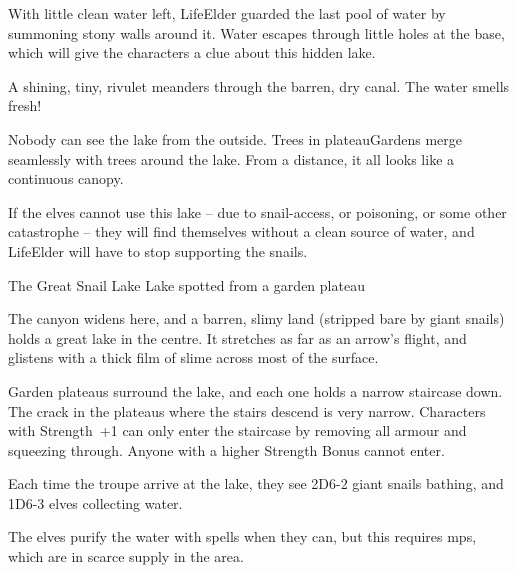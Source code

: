 
With little clean water left, \gls{LifeElder} guarded the last pool of water by summoning stony walls around it.
Water escapes through little holes at the base, which will give the characters a clue about this hidden lake.

\begin{boxtext}
  A shining, tiny, rivulet meanders through the barren, dry canal.
  The water smells fresh!
\end{boxtext}

Nobody can see the lake from the outside.
Trees in \gls{plateauGardens} merge seamlessly with trees around the lake.
From a distance, it all looks like a continuous canopy.

If the elves cannot use this lake -- due to snail-access, or poisoning, or some other catastrophe -- they will find themselves without a clean source of water, and \gls{LifeElder} will have to stop supporting the snails.

{The Great Snail Lake}%
{Lake spotted from a garden plateau}%

The canyon widens here, and a barren, slimy land (stripped bare by giant snails) holds a great lake in the centre.
It stretches as far as an arrow's flight, and glistens with a thick film of slime across most of the surface.

Garden plateaus surround the lake, and each one holds a narrow staircase down.
The crack in the plateaus where the stairs descend is very narrow.
Characters with Strength~+1 can only enter the staircase by removing all armour and squeezing through.
Anyone with a higher Strength Bonus cannot enter.

Each time the troupe arrive at the lake,
they see 2D6-2 giant snails bathing, and 1D6-3 elves collecting water.

The elves purify the water with spells when they can, but this requires \glspl{mp}, which are in scarce supply in the area.


